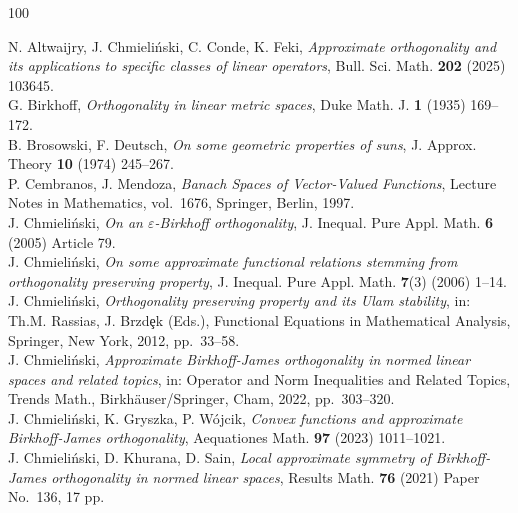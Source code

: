 \documentclass[11pt, reqno]{amsart}
\theoremstyle{definition}
\begin{document}
\begin{thebibliography}{100}

 N. Altwaijry, J. Chmieli\'nski, C. Conde, K. Feki, \textit{Approximate
orthogonality and its applications to specific classes of linear operators}, Bull. Sci.
Math. \textbf{202} (2025) 103645.\\

 G. Birkhoff, \textit{Orthogonality in linear metric spaces}, Duke Math. J.
\textbf{1} (1935) 169--172.\\

 B. Brosowski, F. Deutsch, \textit{On some geometric properties of suns},
J. Approx. Theory \textbf{10} (1974) 245--267.\\

 P. Cembranos, J. Mendoza, \textit{Banach Spaces of Vector-Valued
Functions}, Lecture Notes in Mathematics, vol.~1676, Springer, Berlin, 1997.\\

 J. Chmieli\'nski, \textit{On an $\varepsilon$-Birkhoff orthogonality},
J. Inequal. Pure Appl. Math. \textbf{6} (2005) Article 79.\\

 J. Chmieli\'nski, \textit{On some approximate functional relations
stemming from orthogonality preserving property}, J. Inequal. Pure Appl. Math.
\textbf{7}(3) (2006) 1--14.\\

 J. Chmieli\'nski, \textit{Orthogonality preserving property and its
Ulam stability}, in: Th.M. Rassias, J. Brzd\c{e}k (Eds.), Functional Equations in
Mathematical Analysis, Springer, New York, 2012, pp.~33--58.\\

 J. Chmieli\'nski, \textit{Approximate Birkhoff-James orthogonality in
normed linear spaces and related topics}, in: Operator and Norm Inequalities and Related
Topics, Trends Math., Birkh\"auser/Springer, Cham, 2022, pp.~303--320.\\

 J. Chmieli\'nski, K. Gryszka, P. W\'ojcik, \textit{Convex functions
and approximate Birkhoff-James orthogonality}, Aequationes Math. \textbf{97} (2023)
1011--1021.\\

 J. Chmieli\'nski, D. Khurana, D. Sain, \textit{Local approximate symmetry
of Birkhoff-James orthogonality in normed linear spaces}, Results Math. \textbf{76}
(2021) Paper No.~136, 17 pp.\\


\end{thebibliography}
\end{document}
